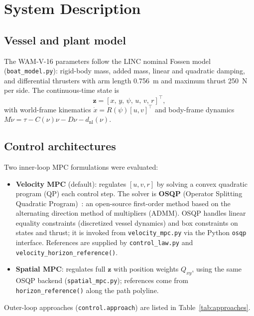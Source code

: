 \documentclass[11pt,a4paper]{article}
\begin{document}
\section{System Description}
\label{sec:system}

\subsection{Vessel and plant model}

The WAM-V-16 parameters follow the LINC nominal Fossen model (\texttt{boat\_model.py}):
rigid-body mass, added mass, linear and quadratic damping, and differential thrusters with
arm length \SI{0.756}{\meter} and maximum thrust \SI{250}{\newton} per side. The
continuous-time state is
\[
  \mathbf{z} = [x,\, y,\, \psi,\, u,\, v,\, r]^\top,
\]
with world-frame kinematics $\dot{x} = R(\psi)[u,v]^\top$ and body-frame dynamics
$M\dot{\nu} = \tau - C(\nu)\nu - D\nu - d_{\mathrm{nl}}(\nu)$.

\subsection{Control architectures}

Two inner-loop MPC formulations were evaluated:
\begin{itemize}[noitemsep]
  \item \textbf{Velocity MPC} (default): regulates $[u,v,r]$ by solving a convex quadratic
        program (QP) each control step. The solver is
        \textbf{OSQP} (Operator Splitting Quadratic Program)~\cite{osqp}: an open-source
        first-order method based on the alternating direction method of multipliers (ADMM).
        OSQP handles linear equality constraints (discretized vessel dynamics) and box
        constraints on states and thrust; it is invoked from \texttt{velocity\_mpc.py} via the
        Python \texttt{osqp} interface. References are supplied by \texttt{control\_law.py}
        and \texttt{velocity\_horizon\_reference()}.
  \item \textbf{Spatial MPC}: regulates full $\mathbf{z}$ with position weights $Q_{xy}$,
        using the same OSQP backend (\texttt{spatial\_mpc.py}); references come from
        \texttt{horizon\_reference()} along the path polyline.
\end{itemize}

Outer-loop approaches (\texttt{control.approach}) are listed in Table~\ref{tab:approaches}.
\end{document}
